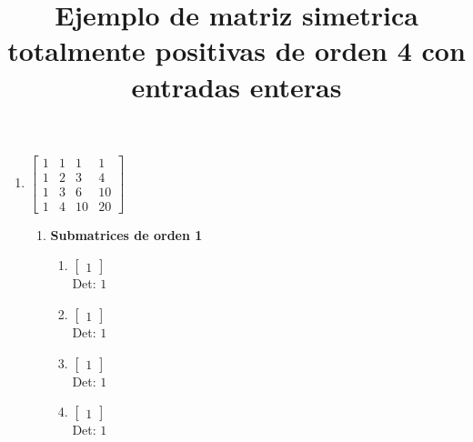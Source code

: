 \documentclass[12pt]{article}
\begin{document}
\title{Ejemplo de matriz simetrica totalmente positivas de orden 4 con entradas enteras}
\maketitle


\begin{enumerate}

\item $\left[\begin{matrix}1 & 1 & 1 & 1\\1 & 2 & 3 & 4\\1 & 3 & 6 & 10\\1 & 4 & 10 & 20\end{matrix}\right]$\\

\begin{enumerate}

\item {\bf Submatrices de orden 1}\\

\begin{enumerate}


\item $\displaystyle \left[\begin{matrix}1\end{matrix}\right]$\\

Det: $1$\\


\item $\displaystyle \left[\begin{matrix}1\end{matrix}\right]$\\

Det: $1$\\


\item $\displaystyle \left[\begin{matrix}1\end{matrix}\right]$\\

Det: $1$\\


\item $\displaystyle \left[\begin{matrix}1\end{matrix}\right]$\\

Det: $1$\\



\end{enumerate}
\end{enumerate}
\end{enumerate}
\end{document}

